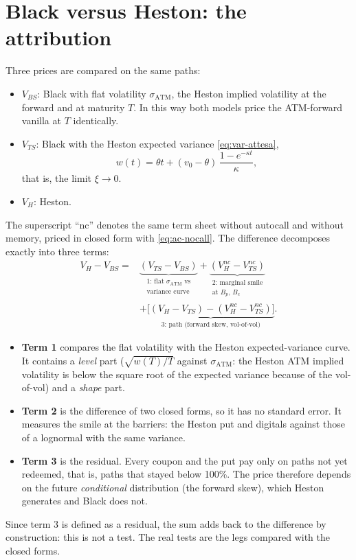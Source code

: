 \section{Black versus Heston: the attribution}
Three prices are compared on the same paths:
\begin{itemize}
\item $V_{BS}$: Black with flat volatility $\sigma_{\mathrm{ATM}}$, the Heston implied volatility at the forward and at
maturity $T$. In this way both models price the ATM-forward vanilla at $T$ identically.
\item $V_{TS}$: Black with the Heston expected variance \eqref{eq:var-attesa},
\[
w(t)=\theta t+(v_0-\theta)\,\frac{1-e^{-\kappa t}}{\kappa},
\]
that is, the limit $\xi\to0$.
\item $V_H$: Heston.
\end{itemize}
The superscript ``nc'' denotes the same term sheet without autocall and without memory, priced in closed form with
\eqref{eq:ac-nocall}. The difference decomposes exactly into three terms:
\begin{equation}\label{eq:attribuzione}
\begin{split}
V_H-V_{BS}={}&\underbrace{(V_{TS}-V_{BS})}_{\substack{\text{1: flat }\sigma_{\mathrm{ATM}}\text{ vs}\\\text{variance curve}}}
+\underbrace{(V^{nc}_H-V^{nc}_{TS})}_{\substack{\text{2: marginal smile}\\\text{at }B_p,\,B_c}}\\
&+\underbrace{\big[(V_H-V_{TS})-(V^{nc}_H-V^{nc}_{TS})\big]}_{\text{3: path (forward skew, vol-of-vol)}} .
\end{split}
\end{equation}
\begin{itemize}
\item \textbf{Term 1} compares the flat volatility with the Heston expected-variance curve. It contains a \emph{level}
part ($\sqrt{w(T)/T}$ against $\sigma_{\mathrm{ATM}}$: the Heston ATM implied volatility is below the square root of
the expected variance because of the vol-of-vol) and a \emph{shape} part.
\item \textbf{Term 2} is the difference of two closed forms, so it has no standard error. It measures the smile at the
barriers: the Heston put and digitals against those of a lognormal with the same variance.
\item \textbf{Term 3} is the residual. Every coupon and the put pay only on paths not yet redeemed, that is, paths
that stayed below 100\%. The price therefore depends on the future \emph{conditional} distribution (the forward skew),
which Heston generates and Black does not.
\end{itemize}
Since term 3 is defined as a residual, the sum adds back to the difference by construction: this is not a test. The
real tests are the legs compared with the closed forms.

